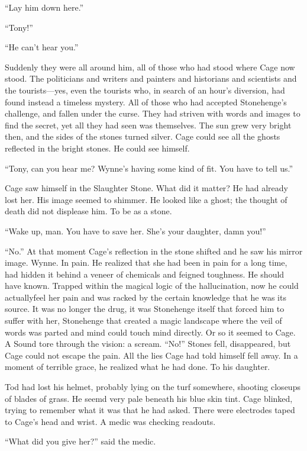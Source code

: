 ``Lay him down here.''

``Tony!''

``He can't hear you.''

Suddenly they were all around him, all of those who had stood where Cage now stood. The politicians and writers and painters and historians and scientists and the tourists---yes, even the tourists who, in search of an hour's diversion, had found instead a timeless mystery. All of those who had accepted Stonehenge's challenge, and fallen under the curse. They had striven with words and images to find the secret, yet all they had seen was themselves. The sun grew very bright then, and the sides of the stones turned silver. Cage could see all the ghosts reflected in the bright stones. He could see himself.

``Tony, can you hear me? Wynne's having some kind of fit. You have to tell us.''

Cage saw himself in the Slaughter Stone. What did it matter? He had already lost her. His image seemed to shimmer. He looked like a ghost; the thought of death did not displease him. To be as a stone.

``Wake up, man. You have to save her. She's your daughter, damn you!''

``No.'' At that moment Cage's reflection in the stone shifted and he saw his mirror image. Wynne. In pain. He realized that she had been in pain for a long time, had hidden it behind a veneer of chemicals and feigned toughness. He should have known. Trapped within the magical logic of the hallucination, now he could actuallyfeel her pain and was racked by the certain knowledge that he was its source. It was no longer the drug, it was Stonehenge itself that forced him to suffer with her, Stonehenge that created a magic landscape where the veil of words was parted and mind could touch mind directly. Or so it seemed to Cage. A Sound tore through the vision: a scream. ``No!'' Stones fell, disappeared, but Cage could not escape the pain. All the lies Cage had told himself fell away. In a moment of terrible grace, he realized what he had done. To his daughter.

Tod had lost his helmet, probably lying on the turf somewhere, shooting closeups of blades of grass. He seemd very pale beneath his blue skin tint. Cage blinked, trying to remember what it was that he had asked. There were electrodes taped to Cage's head and wrist. A medic was checking readouts.

``What did you give her?'' said the medic.


